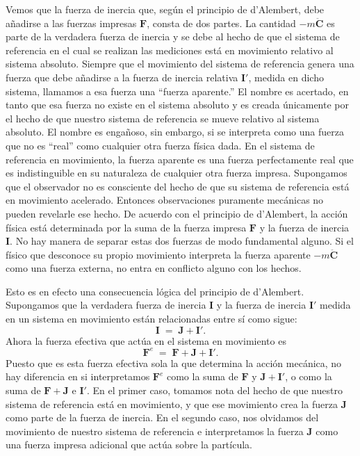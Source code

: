 \documentclass[12pt,a4paper]{book}
\begin{document}
Vemos que la fuerza de inercia que, según el principio de d'Alembert, debe añadirse a las fuerzas impresas $\mathbf{F}$, consta de dos partes. La cantidad $-m\ddot{\mathbf{C}}$ es parte de la verdadera fuerza de inercia y se debe al hecho de que el sistema de referencia en el cual se realizan las mediciones está en movimiento relativo al sistema absoluto. Siempre que el movimiento del sistema de referencia genera una fuerza que debe añadirse a la fuerza de inercia relativa $\mathbf{I}'$, medida en dicho sistema, llamamos a esa fuerza una ``fuerza aparente.'' El nombre es acertado, en tanto que esa fuerza no existe en el sistema absoluto y es creada únicamente por el hecho de que nuestro sistema de referencia se mueve relativo al sistema absoluto. El nombre es engañoso, sin embargo, si se interpreta como una fuerza que no es ``real'' como cualquier otra fuerza física dada. En el sistema de referencia en movimiento, la fuerza aparente es una fuerza perfectamente real que es indistinguible en su naturaleza de cualquier otra fuerza impresa. Supongamos que el observador no es consciente del hecho de que su sistema de referencia está en movimiento acelerado. Entonces observaciones puramente mecánicas no pueden revelarle ese hecho. De acuerdo con el principio de d'Alembert, la acción física está determinada por la suma de la fuerza impresa $\mathbf{F}$ y la fuerza de inercia $\mathbf{I}$. No hay manera de separar estas dos fuerzas de modo fundamental alguno. Si el físico que desconoce su propio movimiento interpreta la fuerza aparente $-m\ddot{\mathbf{C}}$ como una fuerza externa, no entra en conflicto alguno con los hechos.

Esto es en efecto una consecuencia lógica del principio de d'Alembert. Supongamos que la verdadera fuerza de inercia $\mathbf{I}$ y la fuerza de inercia $\mathbf{I}'$ medida en un sistema en movimiento están relacionadas entre sí como sigue:
\begin{equation}
\mathbf{I} \;=\; \mathbf{J} + \mathbf{I}'. \tag{44.5}
\end{equation}
Ahora la fuerza efectiva que actúa en el sistema en movimiento es
\begin{equation}
\mathbf{F}^e \;=\; \mathbf{F} + \mathbf{J} + \mathbf{I}'. \tag{44.6}
\end{equation}
Puesto que es esta fuerza efectiva sola la que determina la acción mecánica, no hay diferencia en si interpretamos $\mathbf{F}^e$ como la suma de $\mathbf{F}$ y $\mathbf{J} + \mathbf{I}'$, o como la suma de $\mathbf{F} + \mathbf{J}$ e $\mathbf{I}'$. En el primer caso, tomamos nota del hecho de que nuestro sistema de referencia está en movimiento, y que ese movimiento crea la fuerza $\mathbf{J}$ como parte de la fuerza de inercia. En el segundo caso, nos olvidamos del movimiento de nuestro sistema de referencia e interpretamos la fuerza $\mathbf{J}$ como una fuerza impresa adicional que actúa sobre la partícula.
\end{document}
